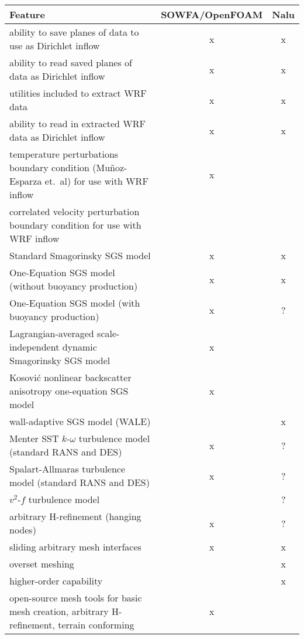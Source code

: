 \documentclass{article}
\begin{document}
\begin{center}
\begin{tabular}{ l | c | c }
\toprule
\textbf{Feature} & \textbf{SOWFA/OpenFOAM} & \textbf{Nalu} \\



\midrule
ability to save planes of data to use as Dirichlet inflow & x & x \\
ability to read saved planes of data as Dirichlet inflow & x & x \\
utilities included to extract WRF data & x & x \\
ability to read in extracted WRF data as Dirichlet inflow & x & x \\
temperature perturbations boundary condition (Mu\~noz-Esparza et.~al) for use with WRF inflow & x &   \\
correlated velocity perturbation boundary condition for use with WRF inflow &   &   \\


\midrule
Standard Smagorinsky SGS model & x & x \\
One-Equation SGS model (without buoyancy production) & x & x \\
One-Equation SGS model (with buoyancy production) & x & ? \\
Lagrangian-averaged scale-independent dynamic Smagorinsky SGS model & x &   \\
Kosovi\'{c} nonlinear backscatter anisotropy one-equation SGS model & x &   \\
wall-adaptive SGS model (WALE) &   & x \\



\midrule
Menter SST $k$-$\omega$ turbulence model (standard RANS and DES) & x & ? \\
Spalart-Allmaras turbulence model (standard RANS and DES) & x & ? \\
$v^2$-$f$ turbulence model &  & ? \\

\midrule
arbitrary H-refinement (hanging nodes) & x & ? \\
sliding arbitrary mesh interfaces & x & x \\
overset meshing &  & x \\
higher-order capability &  & x \\
open-source mesh tools for basic mesh creation, arbitrary H-refinement, terrain conforming & x &   \\


\end{tabular}
\end{center}
\end{document}
